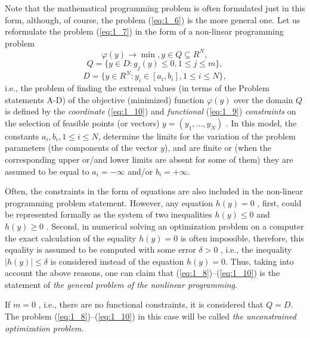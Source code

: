 Note that the mathematical programming problem is often formulated just in this form, although, of course, the problem (\ref{eq:1_6}) is the more general one. Let us reformulate the problem (\ref{eq:1_7}) in the form of a non-linear programming problem
\begin{equation}
\label{eq:1_8}
\varphi(y)\rightarrow\min, y \in Q\subseteq R^N,
\end{equation}
\begin{equation}
\label{eq:1_9}
Q=\{y \in D:g_j(y)\leq 0,1\leq j\leq m \},
\end{equation}
\begin{equation}
\label{eq:1_10}
D=\{y \in R^N:y_i\in [a_i,b_i],1\leq i\leq N \},
\end{equation}
i.e., the problem of finding the extremal values (in terms of the Problem statements A-D) of the objective (minimized) function $\varphi(y)$  over the domain $Q$ is defined by the \textit{coordinate} (\ref{eq:1_10}) and \textit{functional} (\ref{eq:1_9}) \textit{constraints} on the selection of feasible points (or vectors) $y=(y_1,\ldots ,y_N)$ . In this model, the constants $a_i,b_i, 1\leq i\leq N$,  determine the limits for the variation of the problem parameters (the components of the vector $y$), and are finite or (when the corresponding upper or/and lower limits are absent for some of them) they are assumed to be equal to $a_i=-\infty $  and/or $b_i=+\infty $.

Often, the constraints in the form of equations are also included in the non-linear programming problem statement. However, any equation $h(y)=0$ , first, could be represented formally as the system of two inequalities $h(y)\leq 0$  and $h(y)\geq 0$ . Second, in numerical solving an optimization problem on a computer the exact calculation of the equality $h(y)=0$ is often impossible, therefore, this equality is assumed to be computed  with some error $\delta>0$ , i.e., the inequality $\left|h(y)\right|\leq \delta$ is considered instead of the equation $h(y)=0$. Thus, taking into account the above reasons, one can claim that (\ref{eq:1_8})--(\ref{eq:1_10}) is the statement of  \textit {the general  problem of the nonlinear programming}.

If $m=0$ , i.e., there are no functional constraints, it is considered that $Q=D$. The problem (\ref{eq:1_8})--(\ref{eq:1_10}) in this case will be called \textit {the unconstrained optimization problem}.

